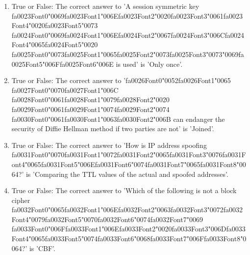\documentclass[12pt]{article}
\begin{document}
\begin{enumerate}[label=\arabic*.]
\item True or False: The correct answer to 'A session symmetric key {\csname fa0023Font0\endcsname\char"0069}{\csname fa0023Font1\endcsname\char"006E}{\csname fa0023Font2\endcsname\char"0020}{\csname fa0023Font3\endcsname\char"0061}{\csname fa0023Font4\endcsname\char"0020}{\csname fa0023Font5\endcsname\char"0073} {\csname fa0024Font0\endcsname\char"0069}{\csname fa0024Font1\endcsname\char"006E}{\csname fa0024Font2\endcsname\char"0067}{\csname fa0024Font3\endcsname\char"006C}{\csname fa0024Font4\endcsname\char"0065}{\csname fa0024Font5\endcsname\char"0020} {\csname fa0025Font0\endcsname\char"0073}{\csname fa0025Font1\endcsname\char"0065}{\csname fa0025Font2\endcsname\char"0073}{\csname fa0025Font3\endcsname\char"0073}{\char"0069}{\csname fa0025Font5\endcsname\char"006F}{\csname fa0025Font6\endcsname\char"006E} is used' is 'Only once'.
\item True or False: The correct answer to '{\csname fa0026Font0\endcsname\char"0052}{\csname fa0026Font1\endcsname\char"0065} {\csname fa0027Font0\endcsname\char"0070}{\csname fa0027Font1\endcsname\char"006C} {\csname fa0028Font0\endcsname\char"0061}{\csname fa0028Font1\endcsname\char"0079}{\csname fa0028Font2\endcsname\char"0020} {\csname fa0029Font0\endcsname\char"0061}{\csname fa0029Font1\endcsname\char"0074}{\csname fa0029Font2\endcsname\char"0074} {\csname fa0030Font0\endcsname\char"0061}{\csname fa0030Font1\endcsname\char"0063}{\csname fa0030Font2\endcsname\char"006B} can endanger the security of Diffie Hellman method if two parties are not' is 'Joined'.
\item True or False: The correct answer to 'How is IP address spoofing {\csname fa0031Font0\endcsname\char"0070}{\csname fa0031Font1\endcsname\char"0072}{\csname fa0031Font2\endcsname\char"0065}{\csname fa0031Font3\endcsname\char"0076}{\csname fa0031Font4\endcsname\char"0065}{\csname fa0031Font5\endcsname\char"006E}{\csname fa0031Font6\endcsname\char"0074}{\csname fa0031Font7\endcsname\char"0065}{\csname fa0031Font8\endcsname\char"0064}?' is 'Comparing the TTL values of the actual and spoofed addresses'.
\item True or False: The correct answer to 'Which of the following is not a block cipher {\csname fa0032Font0\endcsname\char"0065}{\csname fa0032Font1\endcsname\char"006E}{\csname fa0032Font2\endcsname\char"0063}{\csname fa0032Font3\endcsname\char"0072}{\csname fa0032Font4\endcsname\char"0079}{\csname fa0032Font5\endcsname\char"0070}{\csname fa0032Font6\endcsname\char"0074}{\csname fa0032Font7\endcsname\char"0069} {\csname fa0033Font0\endcsname\char"006F}{\csname fa0033Font1\endcsname\char"006E}{\csname fa0033Font2\endcsname\char"0020}{\csname fa0033Font3\endcsname\char"006D}{\csname fa0033Font4\endcsname\char"0065}{\csname fa0033Font5\endcsname\char"0074}{\csname fa0033Font6\endcsname\char"0068}{\csname fa0033Font7\endcsname\char"006F}{\csname fa0033Font8\endcsname\char"0064}?' is 'CBF'.

\end{enumerate}
\end{document}
